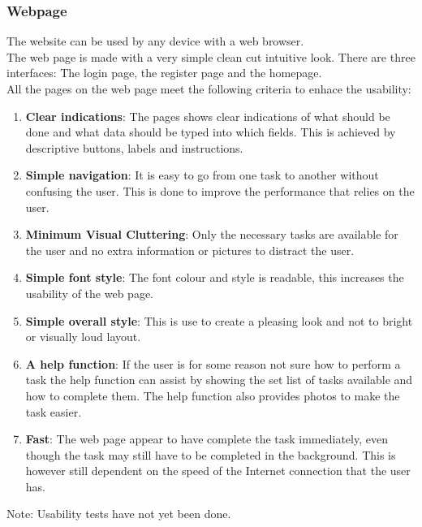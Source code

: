\subsubsection{Webpage}
The website can be used by any device with a web browser.
\\The web page is made with a very simple clean cut intuitive look. There are three interfaces: The login page, the register page and the homepage. 
\\All the pages on the web page meet the following criteria to enhace the usability:
    \begin{enumerate}
    \item \textbf{Clear indications}: The pages shows clear indications of what should be done and what data should be typed into which fields. This is achieved by descriptive buttons, labels and instructions.
    \item \textbf{Simple navigation}: It is easy to go from one task to another without confusing the user. This is done to improve the performance that relies on the user.
    \item \textbf{Minimum Visual Cluttering}: Only the necessary tasks are available for the user and no extra information or pictures to distract the user. 
    \item \textbf{Simple font style}: The font colour and style is readable, this increases the usability of the web page.
    \item \textbf{Simple overall style}: This is use to create a pleasing look and not to bright or visually loud layout.
    \item \textbf{A help function}: If the user is for some reason not sure how to perform a task the help function can assist by showing the set list of tasks available and how to complete them. The help function also provides photos to make the task easier.
    \item \textbf{Fast}: The web page appear to have complete the task immediately, even though the task may still have to be completed in the background. This is however still dependent on the speed of the Internet connection that the user has.%
    
    \end{enumerate}

Note: Usability tests have not yet been done.

